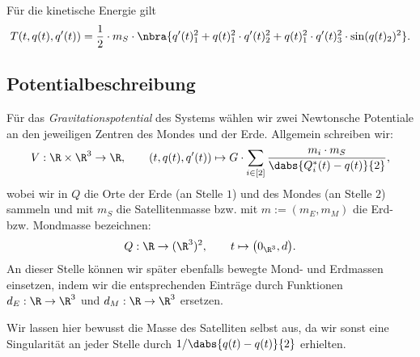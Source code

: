 \documentclass{subfiles}
\begin{document}
        \begin{ergebnis}
            Für die kinetische Energie gilt
            \[
                T(t,q(t),q'(t)) = \frac{1}{2}\cdot m_S\cdot\nbra{q'(t)_1^2 + q(t)_1^2\cdot q'(t)_2^2 + q(t)_1^2\cdot q'(t)_3^2\cdot\sin(q(t)_2)^2}.
            \]
        \end{ergebnis}

    \subsection*{Potentialbeschreibung}
        Für das \emph{Gravitationspotential} des Systems wählen wir zwei Newtonsche Potentiale an den jeweiligen Zentren des Mondes und der Erde. Allgemein schreiben wir:
        \[
            V:\R\times\R^3\to \R,\qquad (t,q(t),q'(t))\mapsto G\cdot\sum_{i\in[2]}\frac{m_i\cdot m_S}{\dabs{Q_i^*(t) - q(t)}{2}},
        \]
        wobei wir in $Q$ die Orte der Erde (an Stelle $1$) und des Mondes (an Stelle $2$) sammeln und mit $m_S$ die Satellitenmasse bzw. mit $m:=(m_E,m_M)$ die Erd- bzw. Mondmasse bezeichnen:
        \[
            Q:\R\to(\R^3)^2,\qquad t\mapsto \bigl(0_{\R^3},d\bigr).
        \]
        An dieser Stelle können wir später ebenfalls bewegte Mond- und Erdmassen einsetzen, indem wir die entsprechenden Einträge durch Funktionen $d_E:\R\to\R^3$ und $d_M:\R\to\R^3$ ersetzen.

        Wir lassen hier bewusst die Masse des Satelliten selbst aus, da wir sonst eine Singularität an jeder Stelle durch $1/\dabs{q(t)-q(t)}{2}$ erhielten. 
\end{document}
